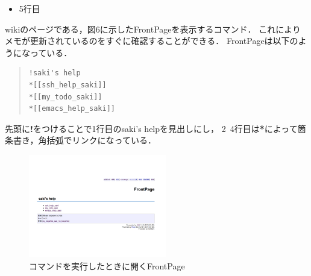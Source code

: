 \begin{itemize}
\item 5行目
\end{itemize}
\begin{description}
\item wikiのページである，図6に示したFrontPageを表示するコマンド．
これによりメモが更新されているのをすぐに確認することができる．
FrontPageは以下のようになっている．
\end{description}
\begin{quote}\begin{verbatim}
!saki's help
*[[ssh_help_saki]]
*[[my_todo_saki]]
*[[emacs_help_saki]]
\end{verbatim}\end{quote}
\begin{description}
\item 先頭に\textbf{!}をつけることで1行目のsaki's helpを見出しにし，
2~4行目は\textbf{*}によって箇条書き，角括弧でリンクになっている．
\end{description}

\begin{figure}[htbp]\begin{center}
\includegraphics[clip,width=6cm,bb=100 100 600 550]{my_help2hiki_saki.002.png}
\caption{コマンドを実行したときに開くFrontPage }
\label{default}\end{center}\end{figure}

